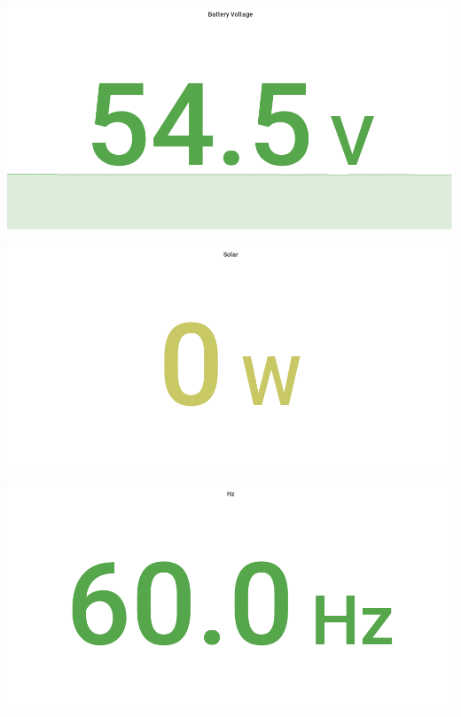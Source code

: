\documentclass{article}
\begin{document}
\begin{center}
\par
\vspace{0.5cm}
\par
\vspace{0.5cm}
\includegraphics[width=\textwidth]{image12}
\par
\vspace{0.5cm}
\par
\vspace{0.5cm}
\includegraphics[width=\textwidth]{image24}
\par
\vspace{0.5cm}
\par
\vspace{0.5cm}
\includegraphics[width=\textwidth]{image18}

\end{center}
\end{document}
